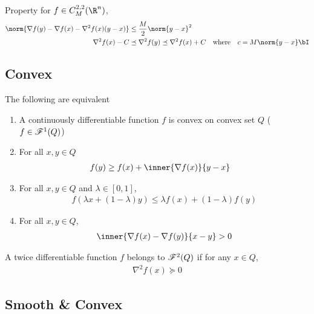 \documentclass[../summary.tex]{subfiles}
\begin{document}
\noindent Property for $f\in C_{M}^{2,2}(\R^n)$,
\begin{align}
    \norm{\nabla f(y) - \nabla f(x) - \nabla^2 f(x)(y-x)}
        &\leq \frac{M}{2} \norm{y-x}^2 \\
    \nabla^2 f(x) - C 
        &\preceq \nabla^2 f(y) 
        \preceq \nabla^2 f(x) + C
        \quad\text{where}\quad
        c = M\norm{y-x}\bI
\end{align}


\subsection{Convex}

\begin{definition}
    The following are equivalent
    \begin{enumerate}
        \item A continuously differentiable function $f$ is convex on convex set $Q$ ($f\in\mathscr{F}^1(Q)$) 
        \item For all $x,y\in Q$
        \begin{align}
            f(y)
                &\geq f(x) + \inner{\nabla f(x)}{y-x}
                \label{eq:definition_convex}
        \end{align}
        \item For all $x,y\in Q$ and $\lambda \in[0,1]$,
        \begin{align}
            f(\lambda x + (1-\lambda)y) 
                \leq \lambda f(x) + (1-\lambda )f(y)
        \end{align}
        \item For all $x,y\in Q$, 
        \begin{align}
            \inner{\nabla f(x) - \nabla f(y)}{x - y} > 0
        \end{align}
    \end{enumerate}
\end{definition}

\begin{definition}
    A twice differentiable function $f$ belongs to $\mathscr{F}^2(Q)$ if for any $x\in Q$, 
    \begin{align}
        \nabla^2 f(x) \succeq 0
    \end{align}
\end{definition}

\subsection{Smooth \& Convex}
\end{document}
